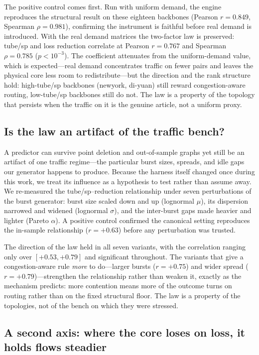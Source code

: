 The positive control comes first. Run with uniform demand, the engine
reproduces the structural result on these eighteen backbones (Pearson
$r=0.849$, Spearman $\rho=0.981$), confirming the instrument is faithful before
real demand is introduced. With the real demand matrices the two-factor law is
preserved: tube/sp and loss reduction correlate at Pearson $r=0.767$ and
Spearman $\rho=0.785$ ($p<10^{-3}$). The coefficient attenuates from the
uniform-demand value, which is expected---real demand concentrates traffic on
fewer pairs and leaves the physical core less room to redistribute---but the
direction and the rank structure hold: high-tube/sp backbones (newyork,
di-yuan) still reward congestion-aware routing, low-tube/sp backbones still do
not. The law is a property of the topology that persists when the traffic on it
is the genuine article, not a uniform proxy.

\subsection{Is the law an artifact of the traffic bench?}
\label{sec:harness-robustness}

A predictor can survive point deletion and out-of-sample graphs yet still be an
artifact of one traffic regime---the particular burst sizes, spreads, and idle
gaps our generator happens to produce. Because the harness itself changed once
during this work, we treat its influence as a hypothesis to test rather than
assume away. We re-measured the tube/sp--reduction relationship under seven
perturbations of the burst generator: burst size scaled down and up (lognormal
$\mu$), its dispersion narrowed and widened (lognormal $\sigma$), and the
inter-burst gaps made heavier and lighter (Pareto $\alpha$). A positive control
confirmed the canonical setting reproduces the in-sample relationship
($r=+0.63$) before any perturbation was trusted.

The direction of the law held in all seven variants, with the correlation
ranging only over $[+0.53, +0.79]$ and significant throughout. The variants
that give a congestion-aware rule \emph{more} to do---larger bursts
($r=+0.75$) and wider spread ($r=+0.79$)---strengthen the relationship rather
than weaken it, exactly as the mechanism predicts: more contention means more
of the outcome turns on routing rather than on the fixed structural floor. The
law is a property of the topologies, not of the bench on which they were
stressed.

\subsection{A second axis: where the core loses on loss, it holds flows steadier}
\label{sec:stability}

